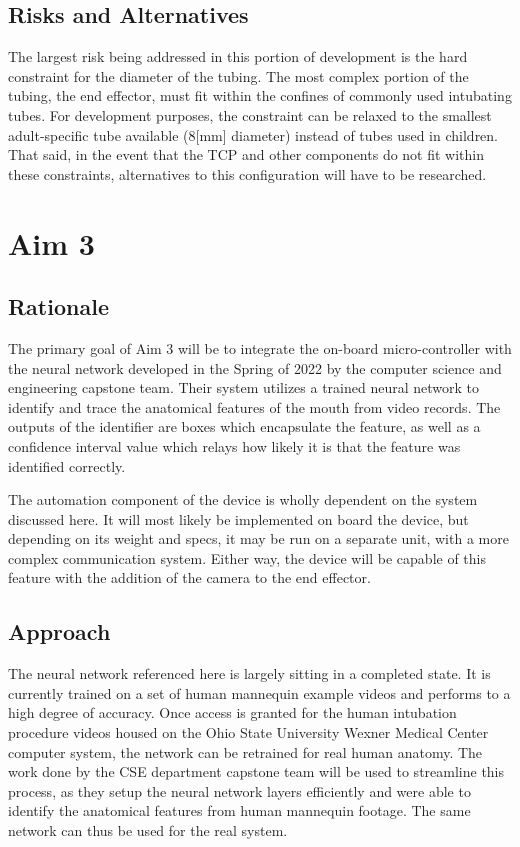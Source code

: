 \subsection{Risks and Alternatives}

The largest risk being addressed in this portion of development is the hard constraint for the diameter of the tubing. The most complex portion of the tubing, the end effector, must fit within the confines of commonly used intubating tubes. For development purposes, the constraint can be relaxed to the smallest adult-specific tube available (8[mm] diameter) instead of tubes used in children. That said, in the event that the TCP and other components do not fit within these constraints, alternatives to this configuration will have to be researched.

\section{Aim 3}

\subsection{Rationale}

The primary goal of Aim 3 will be to integrate the on-board micro-controller with the neural network developed in the Spring of 2022 by the computer science and engineering capstone team. Their system utilizes a trained neural network to identify and trace the anatomical features of the mouth from video records. The outputs of the identifier are boxes which encapsulate the feature, as well as a confidence interval value which relays how likely it is that the feature was identified correctly.

The automation component of the device is wholly dependent on the system discussed here. It will most likely be implemented on board the device, but depending on its weight and specs, it may be run on a separate unit, with a more complex communication system. Either way, the device will be capable of this feature with the addition of the camera to the end effector.

\subsection{Approach}

The neural network referenced here is largely sitting in a completed state. It is currently trained on a set of human mannequin example videos and performs to a high degree of accuracy. Once access is granted for the human intubation procedure videos housed on the Ohio State University Wexner Medical Center computer system, the network can be retrained for real human anatomy. The work done by the CSE department capstone team will be used to streamline this process, as they setup the neural network layers efficiently and were able to identify the anatomical features from human mannequin footage. The same network can thus be used for the real system.

